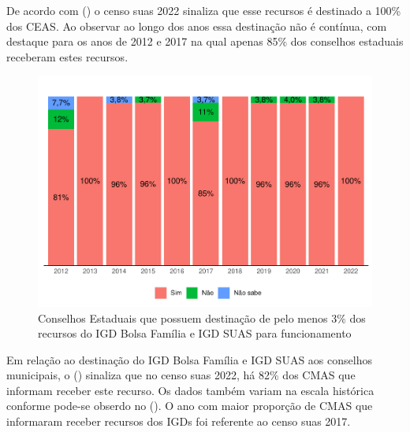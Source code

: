 \documentclass[
  brazilian]{report}
\begin{document}
De acordo com () o censo suas 2022 sinaliza que esse
recursos é destinado a 100\% dos CEAS. Ao observar ao longo dos anos
essa destinação não é contínua, com destaque para os anos de 2012 e 2017
na qual apenas 85\% dos conselhos estaduais receberam estes recursos.

\begin{figure}
\includegraphics{Censo-SUAS-2022_files/figure-latex/ceas_igd-1} \caption[Conselhos Estaduais que possuem destinação de pelo menos 3$\%$ dos recursos do IGD Bolsa Família e IGD SUAS para funcionamento]{Conselhos Estaduais que possuem destinação de pelo menos 3$\%$ dos recursos do IGD Bolsa Família e IGD SUAS para funcionamento}\label{fig:ceas_igd}
\end{figure}

Em relação ao destinação do IGD Bolsa Família e IGD SUAS aos conselhos
municipais, o () sinaliza que no censo
suas 2022, há 82\% dos CMAS que informam receber este recurso. Os dados
também variam na escala histórica conforme pode-se obserdo no
(). O ano com maior proporção de CMAS que informaram
receber recursos dos IGDs foi referente ao censo suas 2017.
\end{document}
